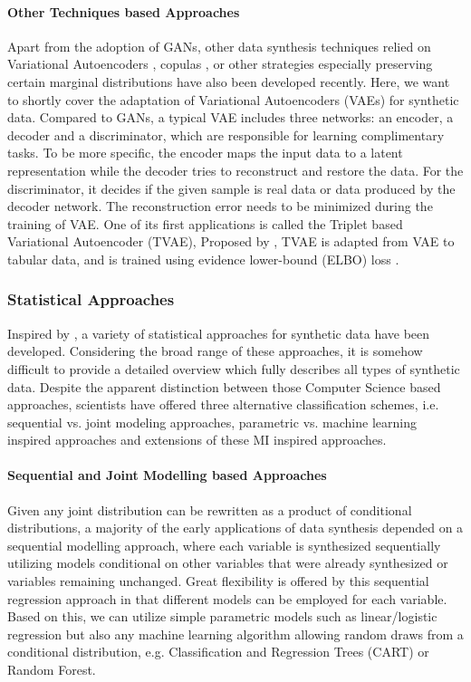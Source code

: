 \paragraph{Other Techniques based Approaches}
Apart from the adoption of GANs, other data synthesis techniques relied on Variational Autoencoders \citep{vardhan2020generating,ma2020vaem},
copulas \citep{patki2016synthetic,kamthe2021copula}, or other strategies especially preserving certain marginal distributions \citep{mckenna2019graphical} have also
been developed recently. Here, we want to shortly cover the adaptation of Variational Autoencoders (VAEs) for synthetic data. Compared to GANs,
a typical VAE includes three networks: an encoder, a decoder and a discriminator, which are responsible for learning complimentary tasks. To be more specific,
the encoder maps the input data to a latent representation while the decoder tries to reconstruct and restore the data. For the discriminator, it decides
if the given sample is real data or data produced by the decoder network. The reconstruction error needs to be minimized during the training of VAE. 
One of its first applications is called the Triplet based Variational Autoencoder (TVAE), Proposed by \citet{xu2019modeling}, TVAE is adapted from VAE to tabular data, and
is trained using evidence lower-bound (ELBO) loss \citep{kingma2013auto}.

\subsubsection{Statistical Approaches}
\label{subsubsec:statsapproach}
Inspired by \citep{rubin1993statistical}, a variety of statistical approaches for synthetic data have been developed. Considering the 
broad range of these approaches, it is somehow difficult to provide a detailed overview which fully describes all types of synthetic data.
Despite the apparent distinction between those Computer Science based approaches, scientists have offered three alternative classification schemes, 
i.e.  sequential vs. joint modeling approaches, parametric vs. machine learning inspired approaches and extensions of these MI inspired approaches.


\paragraph{Sequential and Joint Modelling based Approaches}
Given any joint distribution can be rewritten as a product of conditional distributions, a majority of the early applications of data synthesis depended on a sequential modelling approach, where each 
variable is synthesized sequentially utilizing models conditional on other variables that were already synthesized or variables remaining 
unchanged. Great flexibility is offered by this sequential regression approach in that different models can be employed for each variable.
Based on this, we can utilize simple parametric models such as linear/logistic regression but also any machine learning algorithm allowing random
draws from a conditional distribution, e.g. Classification and Regression Trees (CART) or Random Forest.

